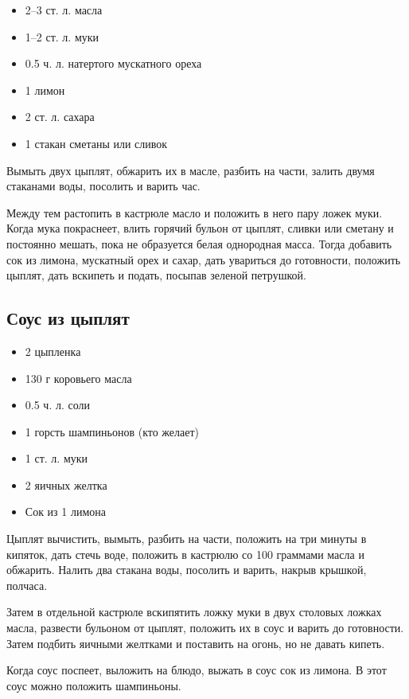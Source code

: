 \begin{itemize}
	\item 2–3 ст. л. масла
    \item 1–2 ст. л. муки
    \item 0.5 ч. л. натертого мускатного ореха
    \item 1 лимон 
    \item 2 ст. л. сахара 
    \item 1 стакан сметаны или сливок
\end{itemize}

Вымыть двух цыплят, обжарить их в масле, разбить на части, залить двумя стаканами воды, посолить и варить час.

Между тем растопить в кастрюле масло и положить в него пару ложек муки. Когда мука покраснеет, влить горячий бульон от цыплят, сливки или сметану и постоянно мешать, пока не образуется белая однородная масса. Тогда добавить сок из лимона, мускатный орех и сахар, дать увариться до готовности, положить цыплят, дать вскипеть и подать, посыпав зеленой петрушкой.

\subsection{Соус из цыплят}

\begin{itemize}
	\item 2 цыпленка
    \item 130 г коровьего масла 
    \item 0.5 ч. л. соли
    \item 1 горсть шампиньонов (кто желает)
    \item 1 ст. л. муки
    \item 2 яичных желтка
    \item Сок из 1 лимона
\end{itemize}

Цыплят вычистить, вымыть, разбить на части, положить на три минуты в кипяток, дать стечь воде, положить в кастрюлю со 100 граммами масла и обжарить. Налить два стакана воды, посолить и варить, накрыв крышкой, полчаса.

Затем в отдельной кастрюле вскипятить ложку муки в двух столовых ложках масла, развести бульоном от цыплят, положить их в соус и варить до готовности. Затем подбить яичными желтками и поставить на огонь, но не давать кипеть.

Когда соус поспеет, выложить на блюдо, выжать в соус сок из лимона. В этот соус можно положить шампиньоны.

